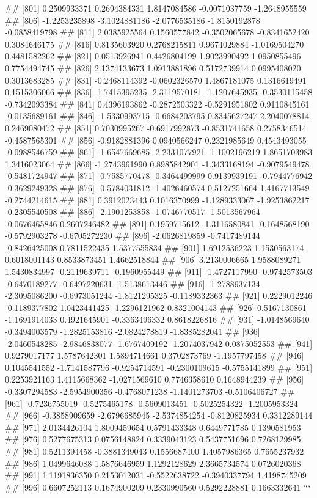 \documentclass[
]{article}
\begin{document}
\begin{enumerate}[label=(\alph*)]
##  [801]  0.2509933371  0.2694384331  1.8147084586 -0.0071037759 -1.2648955559
##  [806] -1.2253235898 -3.1024881186 -2.0776535186 -1.8150192878 -0.0858419798
##  [811]  2.0385925564  0.1560577842 -0.3502065678 -0.8341652420  0.3084646175
##  [816]  0.8135603920  0.2768215811  0.9674029884 -1.0169504270  0.4481582262
##  [821]  0.0513926941  0.4426804199  1.9023990492  1.0950855496  0.7754494745
##  [826]  2.1374133673  1.0913881896  0.5172739914  0.0995408020  0.3013683285
##  [831] -0.2468114392 -0.0602326570  1.4867181075  0.1316619491  0.1515306066
##  [836] -1.7415395235 -2.3119570181 -1.1207645935 -0.3530115458 -0.7342093384
##  [841]  0.4396193862 -0.2872503322 -0.5291951802  0.9110845161 -0.0135689161
##  [846] -1.5330993715 -0.6684203795  0.8345627247  2.2040078814  0.2469080472
##  [851]  0.7030995267 -0.6917992873 -0.8531741658  0.2758346514 -0.4587565301
##  [856] -0.9182881396  0.0940566247  0.2321985649  0.4543493055 -0.0988546759
##  [861] -1.6547669685 -2.2331077921 -1.1002196219  1.8651703983  1.3416023064
##  [866] -1.2743961990  0.8985842901 -1.3433168194 -0.9079549478 -0.5481724947
##  [871] -0.7585770478 -0.3464499999  0.9139939191 -0.7944776942 -0.3629249328
##  [876] -0.5784031812 -1.4026460574  0.5127251664  1.4167713549 -0.2744214615
##  [881]  0.3912023443  0.1016370999 -1.1289333067 -1.9253862217 -0.2305540508
##  [886] -2.1901253858 -1.0746770517 -1.5013567964 -0.0676465846  0.2607246482
##  [891]  0.1959715612 -1.3116580841 -0.1648568190 -0.5792903278 -0.6705272230
##  [896] -2.0626819859 -0.7417489144 -0.8426425008  0.7811522435  1.5377555834
##  [901]  1.6912536223  1.1530563174  0.6018001143  0.8533873451  1.4662518844
##  [906]  3.2130006665  1.9588089271  1.5430834997 -0.2119639711 -0.1960955449
##  [911] -1.4727117990 -0.9742573503 -0.6470189277 -0.6497220631 -1.5138613446
##  [916] -1.2788937134 -2.3095086200 -0.6973051244 -1.8121295325 -0.1189332363
##  [921]  0.2229012246 -0.1189377802  1.0423441425 -1.2296121962  0.8321004143
##  [926]  0.5167130861 -1.1691914033  0.4921645901 -0.3363496332  0.8618226816
##  [931] -1.0148569640 -0.3494003579 -1.2825153816 -2.0824278819 -1.8385282041
##  [936] -2.0460548285 -2.9846838077 -1.6767409192 -1.2074037942  0.0875052553
##  [941]  0.9279017177  1.5787642301  1.5894714661  0.3702873769 -1.1957797458
##  [946]  0.1045541552 -1.7141587796 -0.9254714591 -0.2300109615 -0.5755141899
##  [951]  0.2253921163  1.4115668362 -1.0271569610  0.7746358610  0.1648944239
##  [956] -0.3307294583 -2.5954900356 -0.4768071238 -1.1401273703 -0.5106406727
##  [961] -0.7236755019 -0.5275465178 -0.5609013451 -0.5025254322 -1.2005953324
##  [966] -0.3858909659 -2.6796685945 -2.5374854254 -0.8120825934  0.3312289144
##  [971]  2.0134426104  1.8009459654  0.5791433348  0.6449771785  0.1390581953
##  [976]  0.5277675313  0.0756148824  0.3339043123  0.5437751696  0.7268129985
##  [981]  0.5211394458 -0.3881349043  0.1556687400  1.4057986365  0.7655237932
##  [986]  1.0499646088  1.5876646959  1.1292128629  2.3665734574  0.0726020368
##  [991]  1.1191836350  0.2153012031 -0.5522638722 -0.3940337794  1.4198745209
##  [996]  0.6607252113  0.1674900209  0.2330990560  0.5292228881  0.1663332641
```


\end{enumerate}
\end{document}
